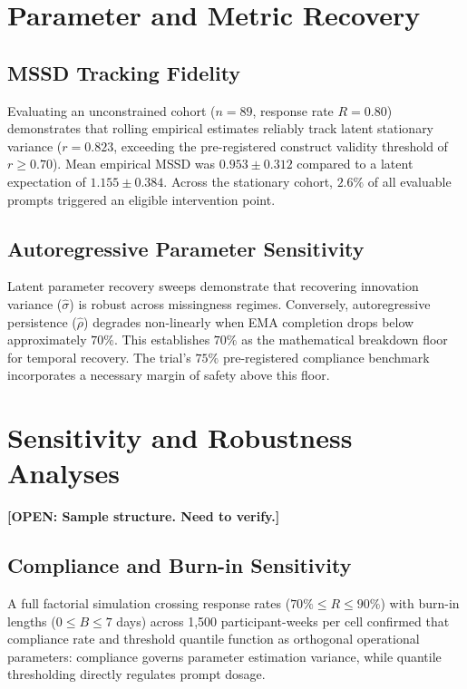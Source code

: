 \documentclass[11pt,letterpaper]{article}
\newcommand{\openitem}[1]{\textbf{\textcolor{red!75!black}{[OPEN: #1]}}}
\begin{document}
\section{Parameter and Metric Recovery}

\subsection{MSSD Tracking Fidelity}

Evaluating an unconstrained cohort ($n = 89$, response rate $R = 0.80$) demonstrates that rolling empirical estimates reliably track latent stationary variance ($r = 0.823$, exceeding the pre-registered construct validity threshold of $r \ge 0.70$). Mean empirical MSSD was $0.953 \pm 0.312$ compared to a latent expectation of $1.155 \pm 0.384$. Across the stationary cohort, $2.6\%$ of all evaluable prompts triggered an eligible intervention point.

\subsection{Autoregressive Parameter Sensitivity}

Latent parameter recovery sweeps demonstrate that recovering innovation variance ($\hat{\sigma}$) is robust across missingness regimes. Conversely, autoregressive persistence ($\hat{\rho}$) degrades non-linearly when EMA completion drops below approximately $70\%$. This establishes $70\%$ as the mathematical breakdown floor for temporal recovery. The trial's $75\%$ pre-registered compliance benchmark incorporates a necessary margin of safety above this floor.

\section{Sensitivity and Robustness Analyses}

\openitem{Sample structure. Need to verify.}

\subsection{Compliance and Burn-in Sensitivity}

A full factorial simulation crossing response rates ($70\% \le R \le 90\%$) with burn-in lengths ($0 \le B \le 7$ days) across 1,500 participant-weeks per cell confirmed that compliance rate and threshold quantile function as orthogonal operational parameters: compliance governs parameter estimation variance, while quantile thresholding directly regulates prompt dosage.
\end{document}
